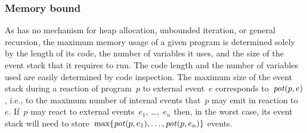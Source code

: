 
\subsubsection{Memory bound}

As \CEU has no mechanism for heap allocation, unbounded iteration, or
general recursion, the maximum memory usage of a given \CEU program is
determined solely by the length of its code, the number of variables it
uses, and the size of the event stack that it requires to run.  The code
length and the number of variables used are easily determined by code
inspection.  The maximum size of the event stack during a reaction of
program~$p$ to external event~$e$ corresponds to~$\operatorname{\mathit{pot}}(p,e)$, i.e., to the
maximum number of internal events that~$p$ may emit in reaction to~$e$.
If~$p$ may react to external events~$e_1$, \dots,~$e_n$ then, in the worst
case, its event stack will need to
store~$\max\{\operatorname{\mathit{pot}}(p,e_1),\dots,\operatorname{\mathit{pot}}(p,e_n)\}$ events.

